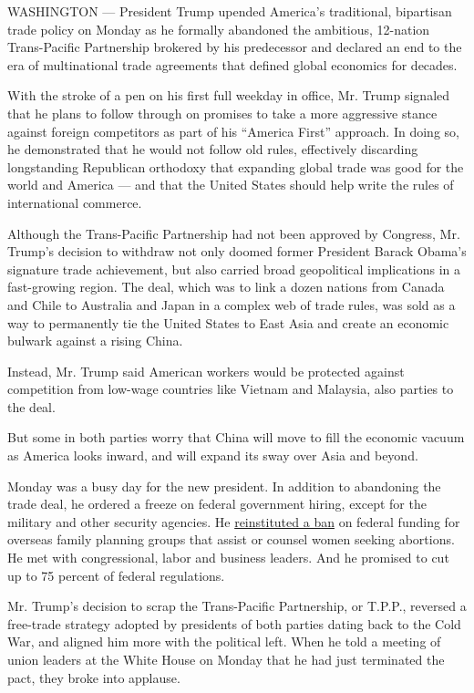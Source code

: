 WASHINGTON --- President Trump upended America's traditional, bipartisan
trade policy on Monday as he formally abandoned the ambitious, 12-nation
Trans-Pacific Partnership brokered by his predecessor and declared an
end to the era of multinational trade agreements that defined global
economics for decades.

With the stroke of a pen on his first full weekday in office, Mr. Trump
signaled that he plans to follow through on promises to take a more
aggressive stance against foreign competitors as part of his ``America
First'' approach. In doing so, he demonstrated that he would not follow
old rules, effectively discarding longstanding Republican orthodoxy that
expanding global trade was good for the world and America --- and that
the United States should help write the rules of international commerce.

Although the Trans-Pacific Partnership had not been approved by
Congress, Mr. Trump's decision to withdraw not only doomed former
President Barack Obama's signature trade achievement, but also carried
broad geopolitical implications in a fast-growing region. The deal,
which was to link a dozen nations from Canada and Chile to Australia and
Japan in a complex web of trade rules, was sold as a way to permanently
tie the United States to East Asia and create an economic bulwark
against a rising China.

Instead, Mr. Trump said American workers would be protected against
competition from low-wage countries like Vietnam and Malaysia, also
parties to the deal.

But some in both parties worry that China will move to fill the economic
vacuum as America looks inward, and will expand its sway over Asia and
beyond.

Monday was a busy day for the new president. In addition to abandoning
the trade deal, he ordered a freeze on federal government hiring, except
for the military and other security agencies. He
\href{https://www.nytimes.com/2017/01/23/world/trump-ban-foreign-aid-abortions.html}{reinstituted
a ban} on federal funding for overseas family planning groups that
assist or counsel women seeking abortions. He met with congressional,
labor and business leaders. And he promised to cut up to 75 percent of
federal regulations.

Mr. Trump's decision to scrap the Trans-Pacific Partnership, or T.P.P.,
reversed a free-trade strategy adopted by presidents of both parties
dating back to the Cold War, and aligned him more with the political
left. When he told a meeting of union leaders at the White House on
Monday that he had just terminated the pact, they broke into applause.

